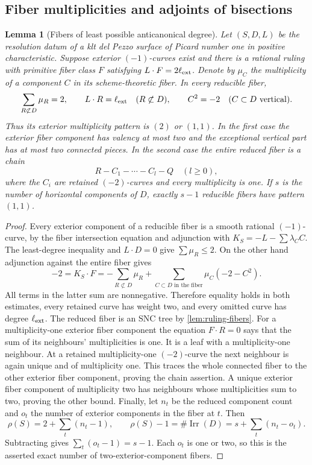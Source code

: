 \documentclass[11pt,reqno]{amsart}
\newtheorem{lemma}[lemma]{Lemma}
\theoremstyle{definition}
\theoremstyle{remark}
\DeclareMathOperator{\Irr}{Irr}
\numberwithin{equation}{section}
\begin{document}
\subsection{Fiber multiplicities and adjoints of bisections}

\begin{lemma}[Fibers of least possible anticanonical degree]
\label{lem:fiber-degree-equality}
Let $(S,D,L)$ be the resolution datum of a klt del Pezzo surface of Picard number one
in positive characteristic. Suppose exterior $(-1)$-curves exist and
there is a rational ruling with primitive fiber class $F$ satisfying
$L\cdot F=2\ell_{\rm ext}$. Denote by $\mu_C$ the multiplicity of a
component $C$ in its scheme-theoretic fiber. In every reducible fiber,
\[
 \sum_{R\not\subset D}\mu_R=2,\qquad
 L\cdot R=\ell_{\rm ext}\quad(R\not\subset D),
 \qquad C^2=-2\quad(C\subset D\text{ vertical}).
\]
Thus its exterior multiplicity pattern is $(2)$ or $(1,1)$.
In the first case the exterior fiber component has valency at most two and the
exceptional vertical part has at most two connected pieces.
In the second case the entire reduced fiber is a chain
\[
 R-C_1-\cdots-C_l-Q\quad(l\ge0),
\]
where the $C_i$ are retained $(-2)$-curves and every multiplicity is one.
If $s$ is the number of horizontal components of $D$, exactly $s-1$
reducible fibers have pattern $(1,1)$.
\end{lemma}

\begin{proof}
Every exterior component of a reducible fiber is a smooth rational
$(-1)$-curve, by the fiber intersection equation and adjunction with
$K_S=-L-\sum\lambda_CC$.
The least-degree inequality and $L\cdot D=0$ give
$\sum\mu_R\le2$. On the other hand adjunction against the entire fiber
gives
\[
 -2=K_S\cdot F
   =-\sum_{R\not\subset D}\mu_R
       +\sum_{C\subset D\text{ in the fiber}}\mu_C(-2-C^2).
\]
All terms in the latter sum are nonnegative. Therefore equality holds
in both estimates, every retained curve has weight two, and every omitted
curve has degree $\ell_{\rm ext}$.
The reduced fiber is an SNC tree by
\cref{lem:ruling-fibers}.
For a multiplicity-one exterior fiber component the equation $F\cdot R=0$ says
that the sum of its neighbours' multiplicities is one. It is a leaf
with a multiplicity-one neighbour. At a retained multiplicity-one
$(-2)$-curve the next neighbour is again unique and of multiplicity one.
This traces the whole connected fiber to the other exterior fiber component,
proving the chain assertion. A unique exterior fiber component of multiplicity two
has neighbours whose multiplicities sum to two, proving the other bound.
Finally, let $n_t$ be the reduced component count and $o_t$ the number
of exterior components in the fiber at $t$. Then
\[
 \rho(S)=2+\sum_t(n_t-1),\qquad
 \rho(S)-1=\#\Irr(D)=s+\sum_t(n_t-o_t).
\]
Subtracting gives $\sum_t(o_t-1)=s-1$. Each $o_t$ is one or two,
so this is the asserted exact number of two-exterior-component fibers.
\end{proof}
\end{document}
